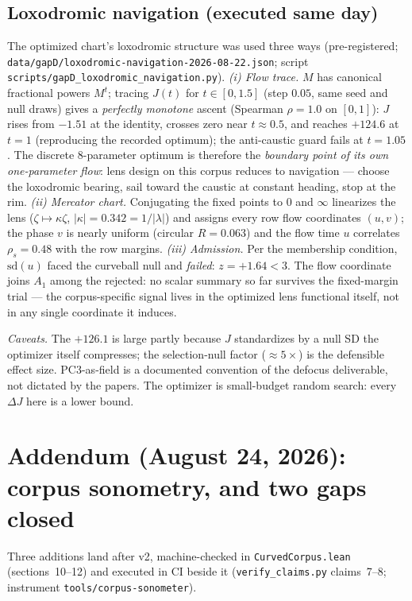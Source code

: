 \documentclass[11pt,a4paper]{article}
\theoremstyle{plain}
\theoremstyle{remark}
\begin{document}
\subsection{Loxodromic navigation (executed same day)}
The optimized chart's loxodromic structure was used three ways (pre-registered; \texttt{data/gapD/loxodromic-navigation-2026-08-22.json}; script \texttt{scripts/gapD\_loxodromic\_navigation.py}). \emph{(i) Flow trace.} $M$ has canonical fractional powers $M^t$; tracing $J(t)$ for $t \in [0, 1.5]$ (step $0.05$, same seed and null draws) gives a \emph{perfectly monotone} ascent (Spearman $\rho = 1.0$ on $[0,1]$): $J$ rises from $-1.51$ at the identity, crosses zero near $t \approx 0.5$, and reaches $+124.6$ at $t = 1$ (reproducing the recorded optimum); the anti-caustic guard fails at $t = 1.05$. The discrete 8-parameter optimum is therefore the \emph{boundary point of its own one-parameter flow}: lens design on this corpus reduces to navigation --- choose the loxodromic bearing, sail toward the caustic at constant heading, stop at the rim. \emph{(ii) Mercator chart.} Conjugating the fixed points to $0$ and $\infty$ linearizes the lens ($\zeta \mapsto \kappa\zeta$, $|\kappa| = 0.342 = 1/|\lambda|$) and assigns every row flow coordinates $(u, v)$; the phase $v$ is nearly uniform (circular $R = 0.063$) and the flow time $u$ correlates $\rho_s = 0.48$ with the row margins. \emph{(iii) Admission.} Per the membership condition, $\mathrm{sd}(u)$ faced the curveball null and \emph{failed}: $z = +1.64 < 3$. The flow coordinate joins $A_1$ among the rejected: no scalar summary so far survives the fixed-margin trial --- the corpus-specific signal lives in the optimized lens functional itself, not in any single coordinate it induces.

\emph{Caveats.} The $+126.1$ is large partly because $J$ standardizes by a null SD the optimizer itself compresses; the selection-null factor ($\approx 5\times$) is the defensible effect size. PC3-as-field is a documented convention of the defocus deliverable, not dictated by the papers. The optimizer is small-budget random search: every $\Delta J$ here is a lower bound.

\section{Addendum (August 24, 2026): corpus sonometry, and two gaps closed}
\label{sec:sonometry}
Three additions land after v2, machine-checked in \texttt{CurvedCorpus.lean} (sections~10--12) and executed in CI beside it (\texttt{verify\_claims.py} claims~7--8; instrument \texttt{tools/corpus-sonometer}).
\end{document}
